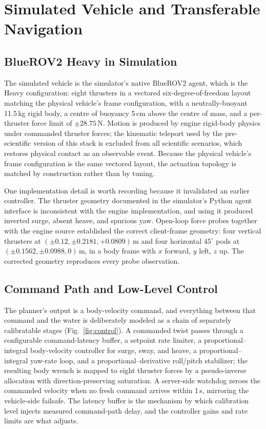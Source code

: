 \section{Simulated Vehicle and Transferable Navigation}
\label{sec:vehicle}

\subsection{BlueROV2 Heavy in Simulation}

The simulated vehicle is the simulator's native BlueROV2 agent, which is the
Heavy configuration: eight thrusters in a vectored six-degree-of-freedom
layout matching the physical vehicle's frame configuration, with a
neutrally-buoyant 11.5\,kg rigid body, a centre of buoyancy 5\,cm above the
centre of mass, and a per-thruster force limit of $\pm 28.75$\,N. Motion is
produced by engine rigid-body physics under commanded thruster forces; the
kinematic teleport used by the pre-scientific version of this stack is
excluded from all scientific scenarios, which restores physical contact as an
observable event. Because the physical vehicle's frame configuration is the
same vectored layout, the actuation topology is matched by construction
rather than by tuning.

One implementation detail is worth recording because it invalidated an
earlier controller. The thruster geometry documented in the simulator's
Python agent interface is inconsistent with the engine implementation, and
using it produced inverted surge, absent heave, and spurious yaw. Open-loop
force probes together with the engine source established the correct
client-frame geometry: four vertical thrusters at $(\pm 0.12, \pm 0.2181,
+0.0809)$\,m and four horizontal $45^{\circ}$ pods at $(\pm 0.1562, \pm
0.0988, 0)$\,m, in a body frame with $x$ forward, $y$ left, $z$ up. The
corrected geometry reproduces every probe observation.

\subsection{Command Path and Low-Level Control}

The planner's output is a body-velocity command, and everything between that
command and the water is deliberately modeled as a chain of separately
calibratable stages (Fig.~\ref{fig:control}). A commanded twist passes
through a configurable command-latency buffer, a setpoint rate limiter, a
proportional--integral body-velocity controller for surge, sway, and heave, a
proportional--integral yaw-rate loop, and a proportional--derivative
roll/pitch stabilizer; the resulting body wrench is mapped to eight thruster
forces by a pseudo-inverse allocation with direction-preserving saturation. A
server-side watchdog zeroes the commanded velocity when no fresh command
arrives within 1\,s, mirroring the vehicle-side failsafe. The latency buffer
is the mechanism by which calibration level \STWO{} injects measured
command-path delay, and the controller gains and rate limits are what
\STHREE{} adjusts.

